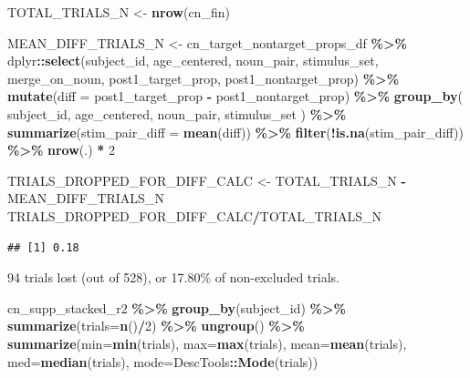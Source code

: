 \documentclass[
  doc,floatsintext]{apa6}
\newenvironment{Shaded}{\begin{snugshade}}{\end{snugshade}}
\newcommand{\AttributeTok}[1]{\textcolor[rgb]{0.13,0.29,0.53}{#1}}
\newcommand{\DecValTok}[1]{\textcolor[rgb]{0.00,0.00,0.81}{#1}}
\newcommand{\FunctionTok}[1]{\textcolor[rgb]{0.13,0.29,0.53}{\textbf{#1}}}
\newcommand{\NormalTok}[1]{#1}
\newcommand{\OtherTok}[1]{\textcolor[rgb]{0.56,0.35,0.01}{#1}}
\newcommand{\SpecialCharTok}[1]{\textcolor[rgb]{0.81,0.36,0.00}{\textbf{#1}}}
\begin{document}
\begin{Shaded}
\begin{Highlighting}[]
\NormalTok{TOTAL\_TRIALS\_N }\OtherTok{\textless{}{-}} \FunctionTok{nrow}\NormalTok{(cn\_fin)}

\NormalTok{MEAN\_DIFF\_TRIALS\_N }\OtherTok{\textless{}{-}}\NormalTok{ cn\_target\_nontarget\_props\_df }\SpecialCharTok{\%\textgreater{}\%}
\NormalTok{  dplyr}\SpecialCharTok{::}\FunctionTok{select}\NormalTok{(subject\_id, age\_centered, }
\NormalTok{                noun\_pair, stimulus\_set, merge\_on\_noun, }
\NormalTok{                post1\_target\_prop,}
\NormalTok{                post1\_nontarget\_prop) }\SpecialCharTok{\%\textgreater{}\%}
  \FunctionTok{mutate}\NormalTok{(}\AttributeTok{diff =}\NormalTok{ post1\_target\_prop }\SpecialCharTok{{-}}\NormalTok{ post1\_nontarget\_prop) }\SpecialCharTok{\%\textgreater{}\%}
  \FunctionTok{group\_by}\NormalTok{(}
\NormalTok{    subject\_id, age\_centered, noun\_pair, stimulus\_set}
\NormalTok{  ) }\SpecialCharTok{\%\textgreater{}\%}
  \FunctionTok{summarize}\NormalTok{(}\AttributeTok{stim\_pair\_diff =} \FunctionTok{mean}\NormalTok{(diff)) }\SpecialCharTok{\%\textgreater{}\%}
  \FunctionTok{filter}\NormalTok{(}\SpecialCharTok{!}\FunctionTok{is.na}\NormalTok{(stim\_pair\_diff)) }\SpecialCharTok{\%\textgreater{}\%}
  \FunctionTok{nrow}\NormalTok{(.) }\SpecialCharTok{*} \DecValTok{2}

\NormalTok{TRIALS\_DROPPED\_FOR\_DIFF\_CALC }\OtherTok{\textless{}{-}}\NormalTok{ TOTAL\_TRIALS\_N }\SpecialCharTok{{-}}\NormalTok{ MEAN\_DIFF\_TRIALS\_N }
\NormalTok{TRIALS\_DROPPED\_FOR\_DIFF\_CALC}\SpecialCharTok{/}\NormalTok{TOTAL\_TRIALS\_N }
\end{Highlighting}
\end{Shaded}

\begin{verbatim}
## [1] 0.18
\end{verbatim}

94 trials lost (out of 528), or 17.80\% of non-excluded trials.

\begin{Shaded}
\begin{Highlighting}[]
\NormalTok{cn\_supp\_stacked\_r2 }\SpecialCharTok{\%\textgreater{}\%}
  \FunctionTok{group\_by}\NormalTok{(subject\_id) }\SpecialCharTok{\%\textgreater{}\%}
  \FunctionTok{summarize}\NormalTok{(}\AttributeTok{trials=}\FunctionTok{n}\NormalTok{()}\SpecialCharTok{/}\DecValTok{2}\NormalTok{) }\SpecialCharTok{\%\textgreater{}\%}
  \FunctionTok{ungroup}\NormalTok{() }\SpecialCharTok{\%\textgreater{}\%}
  \FunctionTok{summarize}\NormalTok{(}\AttributeTok{min=}\FunctionTok{min}\NormalTok{(trials),}
            \AttributeTok{max=}\FunctionTok{max}\NormalTok{(trials),}
            \AttributeTok{mean=}\FunctionTok{mean}\NormalTok{(trials),}
            \AttributeTok{med=}\FunctionTok{median}\NormalTok{(trials),}
            \AttributeTok{mode=}\NormalTok{DescTools}\SpecialCharTok{::}\FunctionTok{Mode}\NormalTok{(trials))}
\end{Highlighting}
\end{Shaded}
\end{document}

